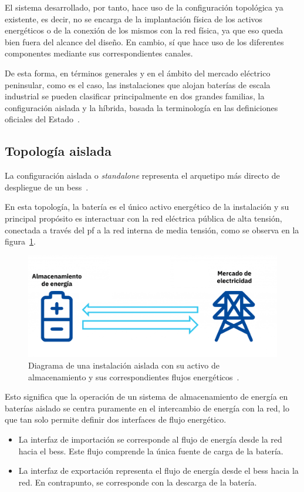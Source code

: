 El sistema desarrollado, por tanto, hace uso de la configuración topológica ya existente, es decir, no se encarga de la implantación física de los activos energéticos o de la conexión de los mismos con la red física, ya que eso queda bien fuera del alcance del diseño. En cambio, sí que hace uso de los diferentes componentes mediante sus correspondientes canales.

De esta forma, en términos generales y en el ámbito del mercado eléctrico peninsular, como es el caso, las instalaciones que alojan baterías de escala industrial se pueden clasificar principalmente en dos grandes familias, la configuración aislada y la híbrida, basada la terminología en las definiciones oficiales del Estado~\cite{cnmc2024servicios}.

\subsection{Topología aislada}%
\label{makereference3.1.1}

La configuración aislada o \textit{standalone} representa el arquetipo más directo de despliegue de un \gls{bess}~\cite{gallo2023stand}.

En esta topología, la batería es el único activo energético de la instalación y su principal propósito es interactuar con la red eléctrica pública de alta tensión, conectada a través del \gls{pf} a la red interna de media tensión, como se observa en la figura~\ref{fig:topologia-aislada}.

\begin{figure}
  \centering
  \includegraphics[width=0.5\linewidth]{figures/topologia-aislada.png}
  \caption[Diagrama de una instalación aislada.]{Diagrama de una instalación aislada con su activo de almacenamiento y sus correspondientes flujos energéticos~\cite{aleasoft2025la}.}%
  \label{fig:topologia-aislada}
\end{figure}

Esto significa que la operación de un sistema de almacenamiento de energía en baterías aislado se centra puramente en el intercambio de energía con la red, lo que tan solo permite definir dos interfaces de flujo energético.

\begin{itemize}

  \item La interfaz de importación se corresponde al flujo de energía desde la red hacia el \gls{bess}. Este flujo comprende la única fuente de carga de la batería.

  \item  La interfaz de exportación representa el flujo de energía desde el \gls{bess} hacia la red. En contrapunto, se corresponde con la descarga de la batería.

\end{itemize}

